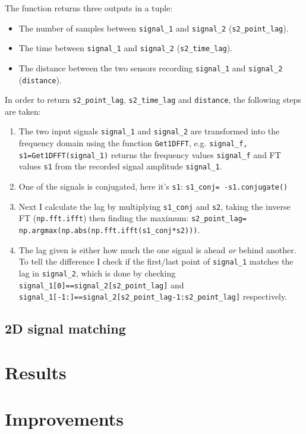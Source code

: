 \documentclass[%
 reprint,
 amsmath,amssymb,
 aps,
floatfix,
]{revtex4-2}
\begin{document}
The function returns three outputs in a tuple:

\begin{itemize}
    \item {The number of samples between \texttt{signal\_1} and \texttt{signal\_2} (\texttt{s2\_point\_lag}).}
    \item {The time between \texttt{signal\_1} and \texttt{signal\_2} (\texttt{s2\_time\_lag}).}
    \item {The distance between the two sensors recording \texttt{signal\_1} and \texttt{signal\_2}} (\texttt{distance}).
\end{itemize}

In order to return \texttt{s2\_point\_lag}, \texttt{s2\_time\_lag} and \texttt{distance}, the following steps are taken:

\begin{enumerate}
    \item The two input signals \texttt{signal\_1} and \texttt{signal\_2} are transformed into the frequency domain using the function \texttt{Get1DFFT}, e.g. \texttt{signal\_f, s1=Get1DFFT(signal\_1)} returns the frequency values \texttt{signal\_f} and FT values \texttt{s1} from the recorded signal amplitude \texttt{signal\_1}.
    \item One of the signals is conjugated, here it's \texttt{s1}: \texttt{s1\_conj= -s1.conjugate()}
    \item Next I calculate the lag by multiplying \texttt{s1\_conj} and \texttt{s2}, taking the inverse FT (\texttt{np.fft.ifft}) then finding the maximum:  \texttt{s2\_point\_lag=}\\\texttt{np.argmax(np.abs(np.fft.ifft(s1\_conj*s2)))}.
    \item The lag given is either how much the one signal is ahead \textit{or} behind another. To tell the difference I check if the first/last point of \texttt{signal\_1} matches the lag in \texttt{signal\_2}, which is done by checking \texttt{signal\_1[0]==signal\_2[s2\_point\_lag]} and\\ \texttt{signal\_1[-1:]==signal\_2[s2\_point\_lag-1:s2\_point\_lag]} respectively.
\end{enumerate}

\subsection{2D signal matching}





\section{Results}


\section{Improvements}
\end{document}
